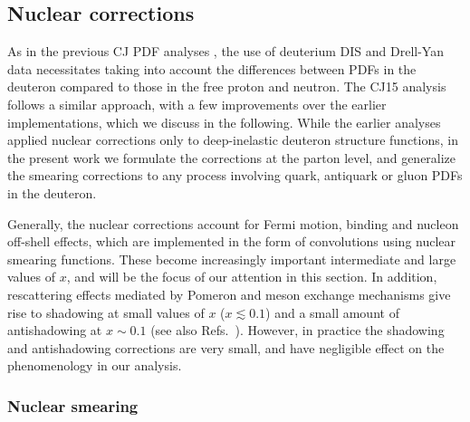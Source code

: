 \documentclass[aps,prd,amsmath,preprint]{revtex4}
\begin{document}
\subsection{Nuclear corrections}
\label{ssec:nuclear}

As in the previous CJ PDF analyses \cite{CJ10, CJ11, CJ12}, the use of
deuterium DIS and Drell-Yan data necessitates taking into account the
differences between PDFs in the deuteron compared to those in the free
proton and neutron.  The CJ15 analysis follows a similar approach,
with a few improvements over the earlier implementations, which we
discuss in the following.  While the earlier analyses applied nuclear
corrections only to deep-inelastic deuteron structure functions, in
the present work we formulate the corrections at the parton level,
and generalize the smearing corrections to any process involving quark,
antiquark or gluon PDFs in the deuteron.


Generally, the nuclear corrections account for Fermi motion, binding
and nucleon off-shell effects, which are implemented in the form of
convolutions using nuclear smearing functions.  These become
increasingly important intermediate and large values of $x$,
and will be the focus of our attention in this section.
In addition, rescattering effects mediated by Pomeron and meson
exchange mechanisms give rise to shadowing at small values of $x$
($x \lesssim 0.1$) and a small amount of antishadowing at $x \sim 0.1$
\cite{MTshad} (see also Refs.~\cite{Badelek92, Kaptari91}).
However, in practice the shadowing and antishadowing corrections
are very small, and have negligible effect on the phenomenology
in our analysis.


\subsubsection{Nuclear smearing}
\label{sssec:smear}
\end{document}
